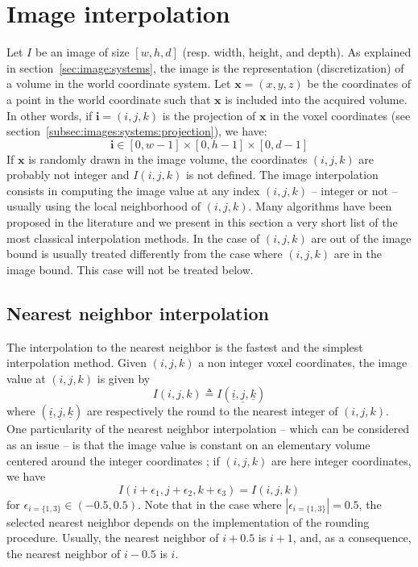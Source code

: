 \section{Image interpolation}
\label{sec:image:interpolation}



Let $I$ be an image of size $[w,h,d]$ (resp. width, height, and depth). As explained in section~\ref{sec:image:systems}, the image is the representation (discretization) of a volume in the world coordinate system.
Let $\mathbf{x}=(x,y,z)$ be the coordinates of a point in the world coordinate such that $\mathbf{x}$ is included into the acquired volume. In other words, if $\mathbf{i}=(i,j,k)$ is the projection of $\mathbf{x}$ in the voxel coordinates (see section~\ref{subsec:images:systems:projection}), we have:
%
\begin{equation}
\mathbf{i} \in [0,w-1]\times[0,h-1]\times[0,d-1]
\end{equation}
%
If $\mathbf{x}$ is randomly drawn in the image volume, the coordinates $(i,j,k)$ are probably not integer and $I(i,j,k)$ is not defined. The image interpolation consists in computing the image value at any index $(i,j,k)$ -- integer or not -- usually using the local neighborhood of $(i,j,k)$. Many algorithms have been proposed in the literature and we present in this section a very short list of the most classical interpolation methods. In the case of $(i,j,k)$ are out of the image bound is usually treated differently from the case where $(i,j,k)$ are in the image bound. This case will not be treated below.



\subsection{Nearest neighbor interpolation}

The interpolation to the nearest neighbor is the fastest and the simplest interpolation method.
Given $(i,j,k)$ a non integer voxel coordinates, the image value at $(i,j,k)$ is given by
%
\begin{equation}
I(i,j,k) \triangleq I( \underline{i}, \underline{j}, \underline{k} )
\end{equation}
%
where $( \underline{i}, \underline{j}, \underline{k} )$ are respectively the round to the nearest integer of $(i,j,k)$.
One particularity of the nearest neighbor interpolation -- which can be considered as an issue -- is that the image value is constant on an elementary volume centered around the integer coordinates ; if $(i,j,k)$ are here integer coordinates, we have
%
\begin{equation}
I(i+\epsilon_1,j+\epsilon_2,k+\epsilon_3) = I(i,j,k)
\end{equation}
%
for $\epsilon_{i=\{1,3\}} \in (-0.5,0.5)$. Note that in the case where $|\epsilon_{i=\{1,3\}}| = 0.5$, the selected nearest neighbor depends on the implementation of the rounding procedure. Usually, the nearest neighbor of $i+0.5$ is $i+1$, and, as a consequence, the nearest neighbor of $i-0.5$ is $i$.



